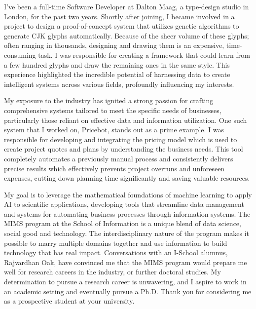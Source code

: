 \documentclass[11pt]{article}
\begin{document}
 \hspace{0.25in}I've been a full-time Software Developer at Dalton Maag, a type-design studio in
London, for the past two years. Shortly after joining, I became involved in a
project to design a proof-of-concept system that utilizes genetic algorithms to
generate CJK glyphs automatically. Because of the sheer volume of these glyphs;
often ranging in thousands, designing and drawing them is an expensive,
time-consuming task. I was responsible for creating a framework that could learn
from a few hundred glyphs and draw the remaining ones in the same style. This
experience highlighted the incredible potential of harnessing data to create
intelligent systems across various fields, profoundly influencing my interests.

 \hspace{0.25in}My exposure to the industry has ignited a strong passion for crafting
comprehensive systems tailored to meet the specific needs of businesses,
particularly those reliant on effective data and information utilization. One
such system that I worked on, Pricebot, stands out as a prime example.  I was
responsible for developing and integrating the pricing model which is used to
create project quotes and plans by understanding the business needs. This tool
completely automates a previously manual process and consistently delivers
precise results which effectively prevents project overruns and unforeseen
expenses, cutting down planning time significantly and saving valuable
resources.

 \hspace{0.25in}My goal is to leverage the mathematical foundations of machine learning to apply
AI to scientific applications, developing tools that streamline data management
and systems for automating business processes through information systems. The
MIMS program at the School of Information is a unique blend of data science,
social good and technology. The interdisciplinary nature of the program makes it
possible to marry multiple domains together and use information to build
technology that has real impact. Conversations with an I-School alumnus,
Rajvardhan Oak, have convinced me that the MIMS program would prepare me well
for research careers in the industry, or further doctoral studies. My
determination to pursue a research career is unwavering, and I aspire to work in
an academic setting and eventually pursue a Ph.D. Thank you for considering me
as a prospective student at your university.
\end{document}
